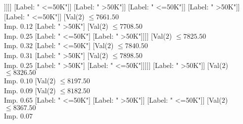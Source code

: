 \documentclass[margin=10pt]{standalone}
\begin{document}
\begin{forest}
																										[Val($2$) $ \leq 7588.50$ \\ Imp. $0.08$
																											[Val($2$) $ \leq 7581.50$ \\ Imp. $0.20$
																												[Val($2$) $ \leq 7545.50$ \\ Imp. $0.14$
																													[Val($2$) $ \leq 7460.50$ \\ Imp. $0.02$
																														[Label: " <=50K"]
																														[Val($2$) $ \leq 7529.50$ \\ Imp. $0.25$
																															[Label: " <=50K"]
																															[Val($2$) $ \leq 7535.50$ \\ Imp. $0.31$
																																[Label: " >50K"]
																																[Val($2$) $ \leq 7536.50$ \\ Imp. $0.25$
																																	[Label: " <=50K"]
																																	[Label: " >50K"]]]]]
																													[Label: " <=50K"]]
																												[Label: " >50K"]]
																											[Label: " <=50K"]]
																										[Label: " >50K"]]
																									[Label: " <=50K"]]
																								[Val($2$) $ \leq 7661.50$ \\ Imp. $0.12$
																									[Label: " >50K"]
																									[Val($2$) $ \leq 7708.50$ \\ Imp. $0.25$
																										[Label: " <=50K"]
																										[Label: " >50K"]]]]
																							[Val($2$) $ \leq 7825.50$ \\ Imp. $0.32$
																								[Label: " <=50K"]
																								[Val($2$) $ \leq 7840.50$ \\ Imp. $0.31$
																									[Label: " >50K"]
																									[Val($2$) $ \leq 7898.50$ \\ Imp. $0.25$
																										[Label: " >50K"]
																										[Label: " <=50K"]]]]]
																						[Label: " >50K"]]
																					[Val($2$) $ \leq 8326.50$ \\ Imp. $0.10$
																						[Val($2$) $ \leq 8197.50$ \\ Imp. $0.09$
																							[Val($2$) $ \leq 8182.50$ \\ Imp. $0.65$
																								[Label: " <=50K"]
																								[Label: " >50K"]]
																							[Label: " <=50K"]]
																						[Val($2$) $ \leq 8367.50$ \\ Imp. $0.07$

\end{forest}
\end{document}
